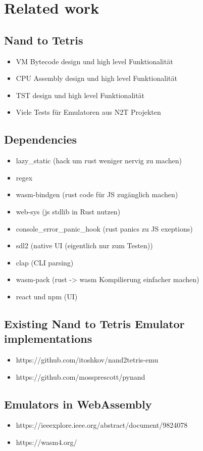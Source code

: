\section{Related work}

\subsection{Nand to Tetris}
\begin{itemize}
  \item VM Bytecode design und high level Funktionalität
  \item CPU Assembly design und high level Funktionalität
  \item TST design und high level Funktionalität
  \item Viele Tests für Emulatoren aus N2T Projekten
\end{itemize}

\subsection{Dependencies}
\begin{itemize}
\item lazy\_static (hack um rust weniger nervig zu machen)
\item regex
\item wasm-bindgen (rust code für JS zugänglich machen)
\item web-sys (js stdlib in Rust nutzen)
\item console\_error\_panic\_hook (rust panics zu JS exeptions)
\item sdl2 (native UI (eigentlich nur zum Testen))
\item clap (CLI parsing)
\item wasm-pack (rust -> wasm Kompilierung einfacher machen)
\item react und npm (UI)
\end{itemize}

\subsection{Existing Nand to Tetris Emulator implementations}
\begin{itemize}
  \item https://github.com/itoshkov/nand2tetris-emu
  \item https://github.com/mossprescott/pynand
\end{itemize}

\subsection{Emulators in WebAssembly}
\begin{itemize}
  \item https://ieeexplore.ieee.org/abstract/document/9824078
  \item https://wasm4.org/
\end{itemize}

